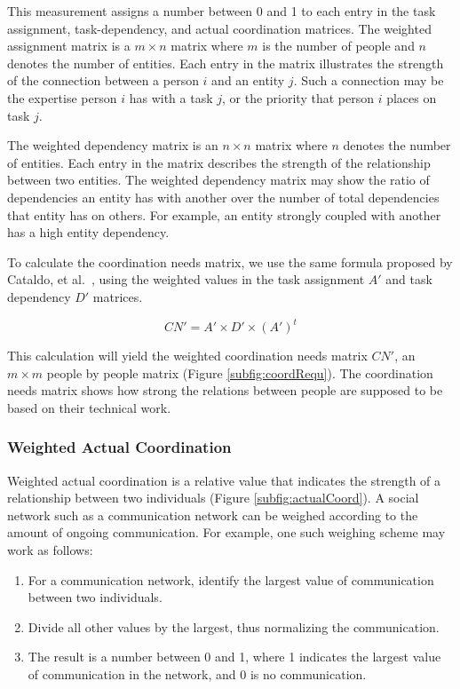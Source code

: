 This measurement assigns a number between 0 and 1 to each entry in the task assignment, task-dependency, and actual coordination matrices.
The weighted assignment matrix is a $m\times n$ matrix where $m$ is the number of people and $n$ denotes the number of entities. 
Each entry in the matrix illustrates the strength of the connection between a person $i$ and an entity $j$. Such a connection may be the expertise person $i$ has with a task $j$, or the priority that person $i$ places on task $j$.

The weighted dependency matrix is an $n\times n$ matrix where $n$ denotes the number of entities.
Each entry in the matrix describes the strength of the relationship between two entities. The weighted dependency matrix may show the ratio of dependencies an entity has with another over the number of total dependencies that entity has on others. 
For example, an entity strongly coupled with another has a high entity dependency.

To calculate the coordination needs matrix, we use the same formula proposed by Cataldo, et al.~\cite{cataldo:cscw:2006}, using the weighted values in the task assignment $A'$ and task dependency $D'$ matrices.

\[ CN' = A' \times D' \times (A')^t \]

\noindent This calculation will yield the weighted coordination needs matrix $CN'$, an $m\times m$ people by people matrix (Figure \ref{subfig:coordRequ}).
The coordination needs matrix shows how strong the relations between people are supposed to be based on their technical work.

\subsubsection{Weighted Actual Coordination}

Weighted actual coordination is a relative value that indicates the strength of a relationship between two individuals (Figure \ref{subfig:actualCoord}). A social network such as a communication network can be weighed according to the amount of ongoing communication. For example, one such weighing scheme may work as follows:

\begin{enumerate}
\item For a communication network, identify the largest value of communication between two individuals.
\item Divide all other values by the largest, thus normalizing the communication.
\item The result is a number between 0 and 1, where 1 indicates the largest value of communication in the network, and 0 is no communication.
\end{enumerate}

